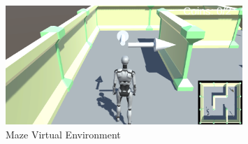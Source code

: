 \begin{figure}[!htbp]
    \centering
    \includegraphics[width=0.8\textwidth]{Figures/Methodology/maze}
    \caption{Maze Virtual Environment}\label{fig:maze}
\end{figure}